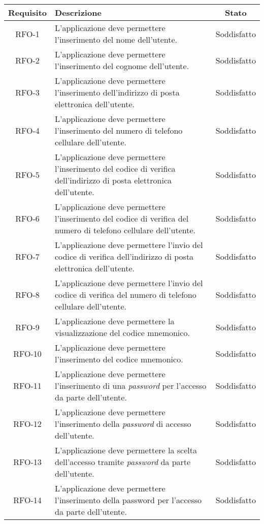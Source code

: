 \begin{longtable}{|c|p{7.65cm}|c|}
	\hline
	\rowcolor{gray}
	\textbf{Requisito} & \textbf{Descrizione} & \textbf{Stato} \\
	\hline
	RFO-1     & L'applicazione deve permettere l'inserimento del nome dell'utente. & Soddisfatto \\
	\hline
	RFO-2     & L'applicazione deve permettere l'inserimento del cognome dell'utente. & Soddisfatto \\
	\hline
	RFO-3     & L'applicazione deve permettere l'inserimento dell'indirizzo di posta elettronica dell'utente. & Soddisfatto \\
	\hline
	RFO-4     & L'applicazione deve permettere l'inserimento del numero di telefono cellulare dell'utente. & Soddisfatto \\
	\hline
	RFO-5     & L'applicazione deve permettere l'inserimento del codice di verifica dell'indirizzo di posta elettronica dell'utente. & Soddisfatto \\
	\hline
	RFO-6     & L'applicazione deve permettere l'inserimento del codice di verifica del numero di telefono cellulare dell'utente. & Soddisfatto \\
	\hline
	RFO-7     & L'applicazione deve permettere l'invio del codice di verifica dell'indirizzo di posta elettronica dell'utente. & Soddisfatto \\
	\hline
	RFO-8     & L'applicazione deve permettere l'invio del codice di verifica del numero di telefono cellulare dell'utente. & Soddisfatto \\
	\hline
	RFO-9     & L'applicazione deve permettere la visualizzazione del codice mnemonico. & Soddisfatto \\
	\hline
	RFO-10    & L'applicazione deve permettere l'inserimento del codice mnemonico. & Soddisfatto \\
	\hline
	RFO-11    & L'applicazione deve permettere l'inserimento di una \textit{password} per l'accesso da parte dell'utente. & Soddisfatto \\
	\hline
	RFO-12    & L'applicazione deve permettere l'inserimento della \textit{password} di accesso dell'utente. & Soddisfatto \\
	\hline
	RFO-13    & L'applicazione deve permettere la scelta dell'accesso tramite \textit{password} da parte dell'utente. & Soddisfatto \\
	\hline
	RFO-14    & L'applicazione deve permettere l'inserimento della password per l'accesso da parte dell'utente. & Soddisfatto \\

\end{longtable}

